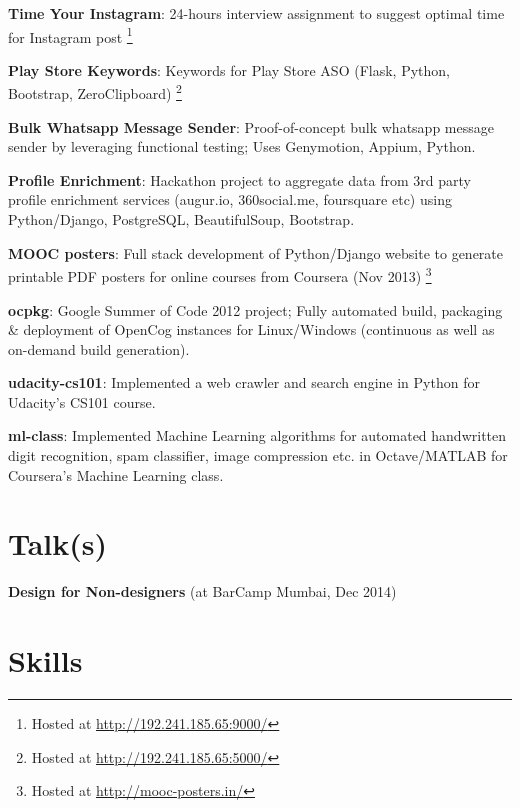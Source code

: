 \documentclass[margin,line]{resume}
\begin{document}
\begin{resume}
\begin{list2}
	\item \textbf{Time Your Instagram}: 24-hours interview assignment to suggest optimal time for Instagram post \footnote{Hosted at \url{http://192.241.185.65:9000/}}
	\item \textbf{Play Store Keywords}: Keywords for Play Store ASO (Flask, Python, Bootstrap, ZeroClipboard) \footnote{Hosted at \url{http://192.241.185.65:5000/}}
	\item \textbf{Bulk Whatsapp Message Sender}: Proof-of-concept bulk whatsapp message sender by leveraging functional testing; Uses Genymotion, Appium, Python.
	\item \textbf{Profile Enrichment}: Hackathon project to aggregate data from 3rd party profile enrichment services (augur.io, 360social.me, foursquare etc) using Python/Django, PostgreSQL, BeautifulSoup, Bootstrap.
	\item \textbf{MOOC posters}: Full stack development of Python/Django website to generate printable PDF posters for online courses from Coursera (Nov 2013) \footnote{Hosted at \url{http://mooc-posters.in/}}
	\item \textbf{ocpkg}: Google Summer of Code 2012 project; Fully automated build, packaging \& deployment of OpenCog instances for Linux/Windows (continuous as well as on-demand build generation).
	\item \textbf{udacity-cs101}: Implemented a web crawler and search engine in Python for Udacity's CS101 course.
	\item \textbf{ml-class}: Implemented Machine Learning algorithms for automated handwritten digit recognition, spam classifier, image compression etc. in Octave/MATLAB for Coursera's Machine Learning class.
    \end{list2}

	\section{\mysidestyle Talk(s)}
	\begin{list2}
	\item \textbf{Design for Non-designers} (at BarCamp Mumbai, Dec 2014)
	\end{list2}

    \section{\mysidestyle Skills} 


\end{resume}
\end{document}
